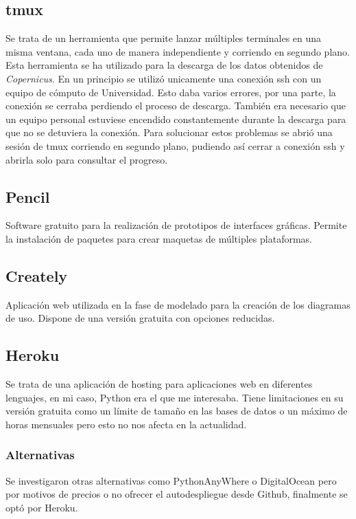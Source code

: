 	\subsection{tmux}\label{tmux}
Se trata de un herramienta que permite lanzar múltiples terminales en una misma ventana, cada uno de manera independiente y corriendo en segundo plano. Esta herramienta se ha utilizado para la descarga de los datos obtenidos de \emph{Copernicus}. En un principio se utilizó unicamente una conexión ssh con un equipo de cómputo de Universidad. Esto daba varios errores, por una parte, la conexión se cerraba perdiendo el proceso de descarga. También era necesario que un equipo personal estuviese encendido constantemente durante la descarga para que no se detuviera la conexión. Para solucionar estos problemas se abrió una sesión de tmux corriendo en segundo plano, pudiendo así cerrar a conexión ssh y abrirla solo para consultar el progreso.

	\subsection{Pencil}
Software gratuito para la realización de prototipos de interfaces gráficas. Permite la instalación de paquetes para crear maquetas de múltiples plataformas. 
	
	\subsection{Creately}
Aplicación web utilizada en la fase de modelado para la creación de los diagramas de uso. Dispone de una versión gratuita con opciones reducidas.

	\subsection{Heroku}\label{HerokuHerrramientas}
Se trata de una aplicación de hosting para aplicaciones web en diferentes lenguajes, en mi caso, Python era el que me interesaba. 
Tiene limitaciones en su versión gratuita como un límite de tamaño en las bases de datos o un máximo de horas mensuales pero esto no nos afecta en la actualidad.
	\subsubsection{Alternativas}
Se investigaron otras alternativas como PythonAnyWhere o DigitalOcean pero por motivos de precios o no ofrecer el autodespliegue desde Github, finalmente se optó por Heroku.

